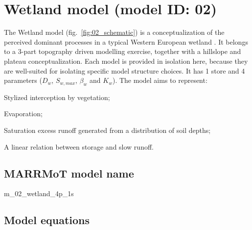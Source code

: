 \section{Wetland model (model ID: 02)}
The Wetland model (fig.~\ref{fig:02_schematic}) is a conceptualization of the perceived dominant processes in a typical Western European wetland \citep{Savenije2010}. It belongs to a 3-part topography driven modelling exercise, together with a hillslope and plateau conceptualization. Each model is provided in isolation here, because they are well-suited for isolating specific model structure choices. It has 1 store and 4 parameters ($D_w$, $S_{w,max}$, $\beta_w$ and $K_w$). The model aims to represent:

\begin{itemizecompact}
\item Stylized interception by vegetation;
\item Evaporation;
\item Saturation excess runoff generated from a distribution of soil depths;
\item A linear relation between storage and slow runoff.
\end{itemizecompact}

\subsection{MARRMoT model name}
m\_02\_wetland\_4p\_1s \\

\subsection{Model equations}

